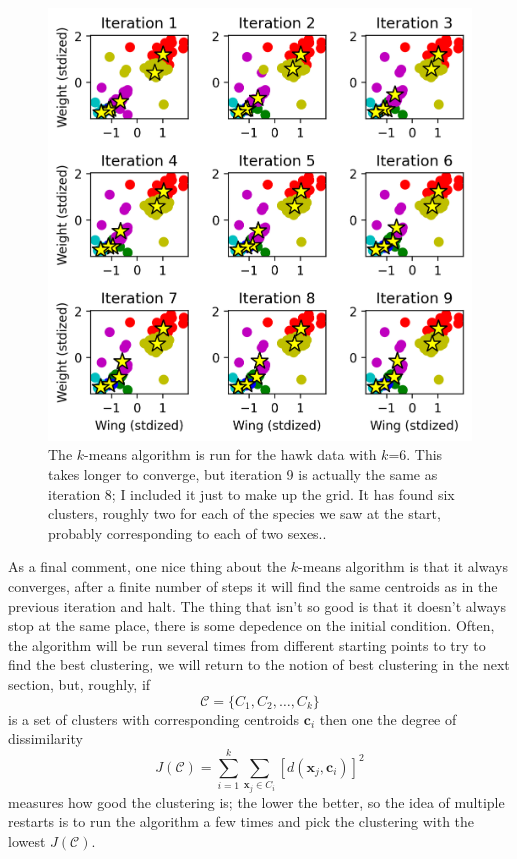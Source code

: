 \documentclass[12pt]{article}
\begin{document}
\begin{figure}[htb]
\begin{center}  
  \includegraphics{04.1_khawks_k6.png}
\end{center}
\caption{The $k$-means algorithm is run for the hawk data with
  $k$=6. This takes longer to converge, but iteration 9 is actually
  the same as iteration 8; I included it just to make up the grid. It
  has found six clusters, roughly two for each of the species we saw
  at the start, probably corresponding to each of two
  sexes..\label{fig:khawksk6}}
\end{figure}

As a final comment, one nice thing about the $k$-means algorithm is
that it always converges, after a finite number of steps it will find
the same centroids as in the previous iteration and halt. The thing
that isn't so good is that it doesn't always stop at the same place,
there is some depedence on the initial condition. Often, the algorithm
will be run several times from different starting points to try to
find the best clustering, we will return to the notion of best
clustering in the next section, but, roughly, if
\begin{equation}
  \mathcal{C}=\{C_1,C_2,\ldots,C_k\}
\end{equation}
is a set of clusters  with corresponding centroids $\mathbf{c}_i$ then one the degree of dissimilarity
\begin{equation}
  J(\mathcal{C})=\sum_{i=1}^k\sum_{\mathbf{x}_j\in C_i}[d(\mathbf{x}_j,\mathbf{c}_i)]^2
\end{equation}
measures how good the clustering is; the lower the better, so the idea
of multiple restarts is to run the algorithm a few times and pick the clustering with the lowest $J(\mathcal{C})$.
\end{document}
